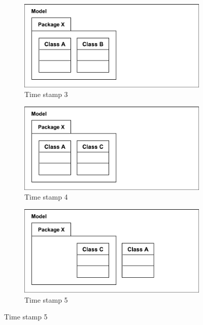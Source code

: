 \begin{figure}[ht]
\begin{subfigure}[t]{0.329\linewidth}
        \includegraphics[width=\linewidth]{images/illustration_5}
        \caption{Time stamp 3}
        \label{fig:illustration_5}
    \end{subfigure}
    \hfill
    \begin{subfigure}[t]{0.329\linewidth}
        \centering
        \includegraphics[width=\linewidth]{images/illustration_6}
        \caption{Time stamp 4}
        \label{fig:illustration_6}
    \end{subfigure}
    \begin{subfigure}[t]{0.329\linewidth}
        \centering
        \includegraphics[width=\linewidth]{images/illustration_7}
        \caption{Time stamp 5}
        \label{fig:illustration_7}
    \end{subfigure}

\end{figure}
